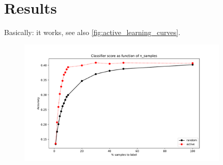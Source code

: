 \documentclass[runningheads,a4paper]{article}
\begin{document}
\section{Results}
\label{sec:results}
Basically: it works, see also \autoref{fig:active_learning_curves}.
\begin{figure}
\begin{center}
\includegraphics[width=0.9\textwidth]{images/active_learning_manifesto.pdf} 
%
\end{center}
\caption{
\label{fig:active_learning_curves}
}
\end{figure}
\end{document}

